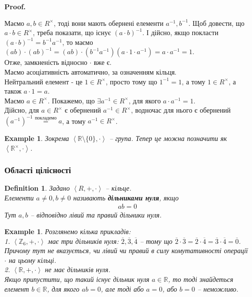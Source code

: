 \documentclass[a4paper, 10pt]{article}
\makeatletter
\theoremstyle{theoremdd}
\theoremstyle{theoremdd}
\newtheorem{definition}[theorem]{Definition}
\theoremstyle{theoremdd}
\theoremstyle{theoremdd}
\theoremstyle{theoremdd}
\newtheorem{example}[theorem]{Example}
\theoremstyle{theoremdd}
\theoremstyle{theoremdd}
\theoremstyle{theoremdd}
\theoremstyle{theoremdd}
\theoremstyle{theoremdd}
\theoremstyle{theoremdd}
\theoremstyle{theoremdd}
\theoremstyle{theoremdd}
\theoremstyle{theoremdd}
\theoremstyle{theoremdd}
\renewenvironment{proof}[1][Proof.\\]{\par
\pushQED{\hfill \qed}%
\normalfont \topsep6\p@\@plus6\p@\relax
\trivlist
\item\relax
{\bfseries
#1\@addpunct{.}}\hspace\labelsep\ignorespaces
}{%
\popQED\endtrivlist\@endpefalse
}
\makeatother
\begin{document}
\begin{proof}
Маємо $a,b \in R^\times$, тоді вони мають обернені елементи $a^{-1},b^{-1}$. Щоб довести, що $a \cdot b \in R^\times$, треба показати, що існує $(a \cdot b)^{-1}$. І дійсно, якщо покласти $(a \cdot b)^{-1} = b^{-1} a^{-1}$, то маємо\\
$(ab) \cdot (ab)^{-1} = (ab) \cdot (b^{-1}a^{-1}) (a \cdot 1 \cdot a^{-1}) = a \cdot a^{-1} = 1$.\\
Отже, замкненість відносно $\cdot$ вже є.\\
Маємо асоціативність автоматично, за означенням кільця.\\
Нейтральний елемент - це $1 \in R^\times$, просто тому що $1^{-1} = 1$, а тому $1 \in R^\times$, а також $a \cdot 1 = a$.\\
Маємо $a \in R^\times$. Покажемо, що $\exists a^{-1} \in R^\times$, для якого $a \cdot a^{-1} = 1$.\\
Дійсно, для $a \in R^\times$ є обернений $a^{-1} \in R^\times$, водночас для нього є обернений $(a^{-1})^{-1} \overset{\text{покладемо}}{=} a$, а тому $a^{-1} \in R^\times$.
\end{proof}

\begin{example}
Зокрема $\left< \mathbb{R} \setminus \{0\}, \cdot \right>$ -- група. Тепер це можна позначити як $\left< \mathbb{R}^{\times}, \cdot \right>$.
\end{example}

\subsubsection{Області цілісності}
\begin{definition}
Задано $\left<R,+,\cdot \right>$ -- кільце.\\
Елементи $a \neq 0,b \neq 0$ називають \textbf{дільниками нуля}, якщо
\begin{align*}
ab=0
\end{align*}
Тут $a,b$ -- відповідно лівий та правий дільники нуля.
\end{definition}

\begin{example}
Розглянемо кілька прикладів:\\
1. $\left< \mathbb{Z}_6, +, \cdot \right>$ має три дільників нуля: $\overline{2}, \overline{3}, \overline{4}$ -- тому що $\overline{2} \cdot \overline{3} = \overline{2} \cdot \overline{4} = \overline{3} \cdot \overline{4} = \overline{0}$. Причому тут не вказується, чи лівий чи правий в силу комутативності операції $\cdot$ на цьому кільці.
\bigskip \\
2. $\left< \mathbb{R}, +, \cdot \right>$ не має дільників нуля.\\
Якщо припустити, що такий існує дільник нуля $a \in \mathbb{R}$, то тоді знайдеться елемент $b \in \mathbb{R}$, для якого $ab=0$, але тоді або $a = 0$, або $b = 0$ -- неможливо.
\end{example}
\end{document}
